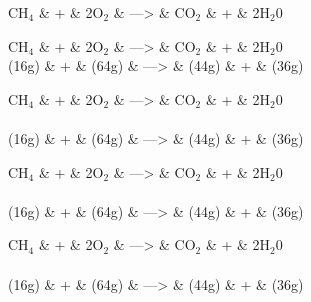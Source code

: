 \begin{dependency}
\begin{deptext}
CH$_4$ \& + \& 2O$_2$ \& --->  \& CO$_2$ \& + \& 2H$_2$0 \\
\end{deptext}
\end{dependency}


\begin{dependency}
\begin{deptext}
CH$_4$ \& + \& 2O$_2$ \& --->  \& CO$_2$ \& + \& 2H$_2$0 \\
 (16g) \& + \& (64g) \& --->  \& (44g) \& + \& (36g) \\
\end{deptext}
\end{dependency}

\begin{dependency}
\begin{deptext}
CH$_4$ \& + \& 2O$_2$ \& --->  \& CO$_2$ \& + \& 2H$_2$0 \\ \\
 (16g) \& + \& (64g) \& --->  \& (44g) \& + \& (36g) \\
\end{deptext}
\end{dependency}

\begin{dependency}[theme=brazil]
\begin{deptext}
CH$_4$ \& + \& 2O$_2$ \& --->  \& CO$_2$ \& + \& 2H$_2$0 \\ \\
 (16g) \& + \& (64g) \& --->  \& (44g) \& + \& (36g) \\
\end{deptext}
\end{dependency}

\begin{dependency}[theme=iron, label theme=copper]
\begin{deptext}
CH$_4$ \& + \& 2O$_2$ \& --->  \& CO$_2$ \& + \& 2H$_2$0 \\ \\
 (16g) \& + \& (64g) \& --->  \& (44g) \& + \& (36g) \\
\end{deptext}
\end{dependency}

